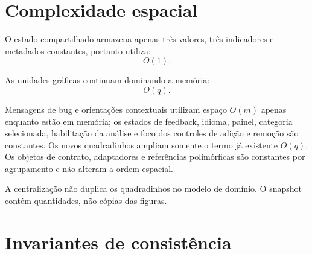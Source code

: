 \documentclass[12pt,a4paper]{article}
\begin{document}
\section{Complexidade espacial}

O estado compartilhado armazena apenas três valores, três indicadores e metadados constantes, portanto utiliza:
\[
O(1).
\]

As unidades gráficas continuam dominando a memória:
\[
O(q).
\]

Mensagens de bug e orientações contextuais utilizam espaço $O(m)$ apenas enquanto estão em memória; os estados de feedback, idioma, painel, categoria selecionada, habilitação da análise e foco dos controles de adição e remoção são constantes. Os novos quadradinhos ampliam somente o termo já existente $O(q)$. Os objetos de contrato, adaptadores e referências polimórficas são constantes por agrupamento e não alteram a ordem espacial.

A centralização não duplica os quadradinhos no modelo de domínio. O snapshot contém quantidades, não cópias das figuras.

\section{Invariantes de consistência}
\end{document}
